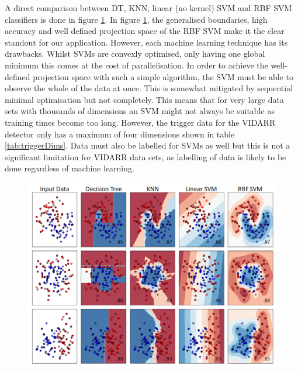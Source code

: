A direct comparison between DT, KNN, linear (no kernel) SVM and RBF SVM classifiers is done in figure \ref{fig:sklearnReleventExamples}. In figure \ref{fig:sklearnReleventExamples}, the generalised boundaries, high accuracy and well defined projection space of the RBF SVM make it the clear standout for our application. However, each machine learning technique has its drawbacks. Whilst SVMs are convexly optimised, only having one global minimum \cite{Boser92atraining} this comes at the cost of parallelisation. In order to achieve the well-defined projection space with such a simple algorithm, the SVM must be able to observe the whole of the data at once. This is somewhat mitigated by sequential minimal optimisation \cite{platt1998sequential} but not completely. This means that for very large data sets with thousands of dimensions an SVM might not always be suitable as training times become too long. However, the trigger data for the VIDARR detector only has a maximum of four dimensions shown in table \ref{tab:triggerDims}. Data must also be labelled for SVMs as well but this is not a significant limitation for VIDARR data sets, as labelling of data is likely to be done regardless of machine learning.
 
\begin{figure}[!h]
\centering
\includegraphics[width=0.9\linewidth]{Chapter4/Figs/Raster/svmLinAndRbf/sklearnReleventExamplesMedText.png}
\label{fig:sklearnReleventExamples}
\end{figure}

